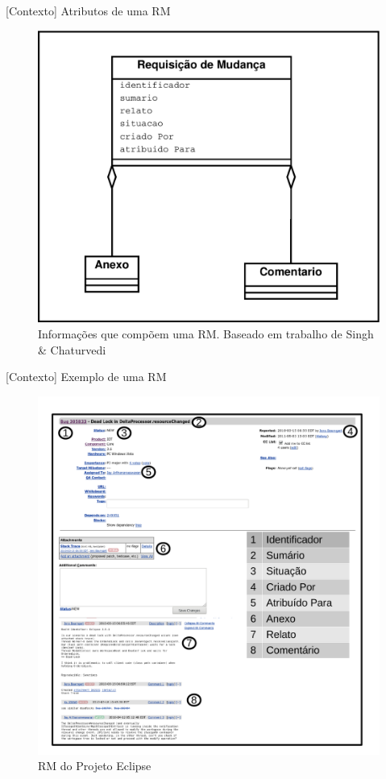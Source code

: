 \documentclass[t,14pt,mathserif]{beamer}
\begin{document}
\begin{frame}{[Contexto] Atributos de uma RM}

    \begin{figure}[htpb]
        \centering
        \includegraphics[width=0.55\linewidth]{../img/diagrama-classe-atributos-requisicao-mudancas.pdf}
        \caption{Informações que compõem uma RM\@. Baseado em trabalho de Singh \&
            Chaturvedi~\cite{singh2011bug}}
\label{fig:diagrama-classe-atributos-requisicao-mudancas}
    \end{figure}

\end{frame}

\begin{frame}{[Contexto] Exemplo de uma RM}

    \begin{figure}[htpb]
        \centering
        \includegraphics[width=0.5\linewidth]{../img/rm-exemplo.pdf}
        \caption{RM do Projeto Eclipse}
\label{fig:rm-exemplo}
    \end{figure}

\end{frame}
\end{document}
